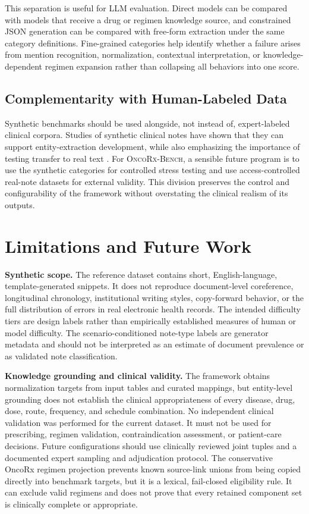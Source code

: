 \documentclass[conference]{IEEEtran}
\newcommand{\dataset}{\textsc{OncoRx-Bench}}
\begin{document}
This separation is useful for LLM evaluation. Direct models can be compared
with models that receive a drug or regimen knowledge source, and constrained
JSON generation can be compared with free-form extraction under the same
category definitions. Fine-grained categories help identify whether a failure
arises from mention recognition, normalization, contextual interpretation, or
knowledge-dependent regimen expansion rather than collapsing all behaviors into
one score.

\subsection{Complementarity with Human-Labeled Data}

Synthetic benchmarks should be used alongside, not instead of, expert-labeled
clinical corpora. Studies of synthetic clinical notes have shown that they can
support entity-extraction development, while also emphasizing the importance of
testing transfer to real text \cite{brekke2021,li2021}. For \dataset, a sensible
future program is to use the synthetic categories for controlled stress testing
and use access-controlled real-note datasets for external validity. This
division preserves the control and configurability of the framework without
overstating the clinical realism of its outputs.
\section{Limitations and Future Work}
\label{sec:limitations}

\textbf{Synthetic scope.}
The reference dataset contains short, English-language, template-generated
snippets. It does not reproduce document-level coreference, longitudinal
chronology, institutional writing styles, copy-forward behavior, or the full
distribution of errors in real electronic health records. The intended
difficulty tiers are design labels rather than empirically established measures
of human or model difficulty. The scenario-conditioned note-type labels are
generator metadata and should not be interpreted as an estimate of document
prevalence or as validated note classification.

\textbf{Knowledge grounding and clinical validity.}
The framework obtains normalization targets from input tables and curated
mappings, but entity-level grounding does not establish the
clinical appropriateness of every disease, drug, dose, route, frequency, and
schedule combination. No independent clinical validation was performed for the
current dataset. It must not be used for prescribing, regimen validation,
contraindication assessment, or patient-care decisions. Future configurations
should use clinically reviewed joint tuples and a documented expert sampling
and adjudication protocol. The conservative OncoRx regimen projection prevents
known source-link unions from being copied directly into benchmark targets, but
it is a lexical, fail-closed eligibility rule. It can exclude valid regimens and
does not prove that every retained component set is clinically complete or
appropriate.
\end{document}
